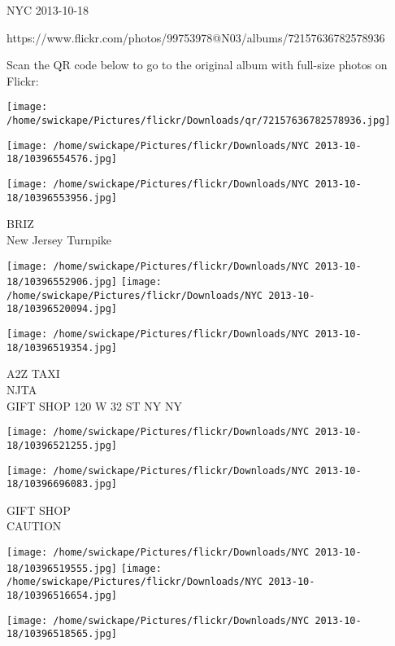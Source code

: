 \documentclass[10pt,letterpaper]{article}
\begin{document}
NYC 2013-10-18

https://www.flickr.com/photos/99753978@N03/albums/72157636782578936

Scan the QR code below to go to the original album with full-size photos on Flickr:

\texttt{[image: /home/swickape/Pictures/flickr/Downloads/qr/72157636782578936.jpg]}
\pagebreak

\texttt{[image: /home/swickape/Pictures/flickr/Downloads/NYC 2013-10-18/10396554576.jpg]}

\vspace{0.25in}
\texttt{[image: /home/swickape/Pictures/flickr/Downloads/NYC 2013-10-18/10396553956.jpg]}

BRIZ\\
New Jersey Turnpike\\
\pagebreak

\texttt{[image: /home/swickape/Pictures/flickr/Downloads/NYC 2013-10-18/10396552906.jpg]}
\texttt{[image: /home/swickape/Pictures/flickr/Downloads/NYC 2013-10-18/10396520094.jpg]}

\vspace{0.25in}
\texttt{[image: /home/swickape/Pictures/flickr/Downloads/NYC 2013-10-18/10396519354.jpg]}

A2Z TAXI\\
NJTA\\
GIFT SHOP 120 W 32 ST NY NY\\
\pagebreak

\texttt{[image: /home/swickape/Pictures/flickr/Downloads/NYC 2013-10-18/10396521255.jpg]}

\vspace{0.25in}
\texttt{[image: /home/swickape/Pictures/flickr/Downloads/NYC 2013-10-18/10396696083.jpg]}

GIFT SHOP\\
CAUTION\\
\pagebreak

\texttt{[image: /home/swickape/Pictures/flickr/Downloads/NYC 2013-10-18/10396519555.jpg]}
\texttt{[image: /home/swickape/Pictures/flickr/Downloads/NYC 2013-10-18/10396516654.jpg]}

\vspace{0.25in}
\texttt{[image: /home/swickape/Pictures/flickr/Downloads/NYC 2013-10-18/10396518565.jpg]}
\end{document}
